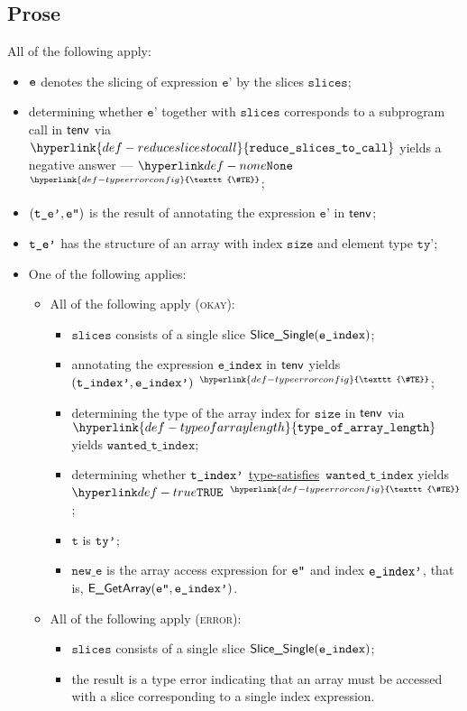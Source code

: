 \documentclass{book}
\newcommand\TypeErrorConfig[0]{\hyperlink{def-typeerrorconfig}{\texttt{\#TE}}}
\newcommand\ProseOrTypeError[0]{\hyperlink{def-proseortypeerror}{$^{\TypeErrorConfig}$}}
\newcommand\typesatisfies[0]{\hyperlink{def-typesatisfies}{type-satisfies}}
\newcommand\reduceslicestocall[0]{\hyperlink{def-reduceslicestocall}{\texttt{reduce\_slices\_to\_call}}}
\newcommand\typeofarraylength[0]{\hyperlink{def-typeofarraylength}{\texttt{type\_of\_array\_length}}}
\newcommand\vt[0]{\texttt{t}}
\newcommand\size[0]{\texttt{size}}
\newcommand\tty[0]{\texttt{ty}}
\newcommand\eindex[0]{\texttt{e\_index}}
\newcommand\wantedtindex[0]{\texttt{wanted\_t\_index}}
\newcommand\slices[0]{\texttt{slices}}
\newcommand\newe[0]{\texttt{new\_e}}
\newcommand\vep[0]{\texttt{e'}}
\begin{document}
\subsection{Prose}
All of the following apply:
\begin{itemize}
  \item $\texttt{e}$ denotes the slicing of expression $\vep$ by the slices $\slices$;
  \item determining whether $\vep$ together with $\slices$ corresponds to a subprogram call
  in $\textsf{tenv}$ via $\reduceslicestocall$ yields a negative answer --- $\None$ \ProseOrTypeError;
  \item $(\texttt{t\_e'},\texttt{e''})$ is the result of annotating the expression $\vep$ in $\textsf{tenv}$;
  \item $\texttt{t\_e'}$ has the structure of an array with index $\size$ and element type $\tty$';
  \item One of the following applies:
  \begin{itemize}
    \item All of the following apply (\textsc{okay}):
    \begin{itemize}
      \item $\slices$ consists of a single slice $\SliceSingle(\eindex)$;
      \item annotating the expression $\eindex$ in $\textsf{tenv}$ yields $(\texttt{t\_index'}, \texttt{e\_index'})$ \ProseOrTypeError;
      \item determining the type of the array index for $\size$ in $\textsf{tenv}$ via \\ $\typeofarraylength$
      yields $\wantedtindex$;
      \item determining whether $\texttt{t\_index'}$ \typesatisfies\ $\wantedtindex$ yields $\True$ \ProseOrTypeError;
      \item $\vt$ is $\texttt{ty'}$;
      \item $\newe$ is the array access expression for $\texttt{e''}$ and index $\texttt{e\_index'}$, that is, $\textsf{E\_GetArray}(\texttt{e''}, \texttt{e\_index'})$.
    \end{itemize}

    \item All of the following apply (\textsc{error}):
    \begin{itemize}
      \item $\slices$ consists of a single slice $\SliceSingle(\eindex)$;
      \item the result is a type error indicating that an array must be accessed with a slice corresponding to a single index
      expression.
    \end{itemize}
  \end{itemize}
\end{itemize}
\end{document}
